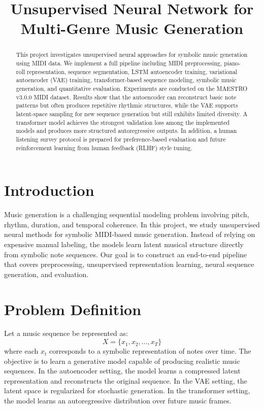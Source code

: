 \documentclass[conference]{IEEEtran}
\title{Unsupervised Neural Network for Multi-Genre Music Generation}
\author{
\IEEEauthorblockN{Your Name(s)}
\IEEEauthorblockA{
CSE425/EEE474 Neural Networks\\
BRAC University
}
}
\begin{document}
\maketitle

\begin{abstract}
This project investigates unsupervised neural approaches for symbolic music generation using MIDI data. We implement a full pipeline including MIDI preprocessing, piano-roll representation, sequence segmentation, LSTM autoencoder training, variational autoencoder (VAE) training, transformer-based sequence modeling, symbolic music generation, and quantitative evaluation. Experiments are conducted on the MAESTRO v3.0.0 MIDI dataset. Results show that the autoencoder can reconstruct basic note patterns but often produces repetitive rhythmic structures, while the VAE supports latent-space sampling for new sequence generation but still exhibits limited diversity. A transformer model achieves the strongest validation loss among the implemented models and produces more structured autoregressive outputs. In addition, a human listening survey protocol is prepared for preference-based evaluation and future reinforcement learning from human feedback (RLHF) style tuning.
\end{abstract}

\section{Introduction}
Music generation is a challenging sequential modeling problem involving pitch, rhythm, duration, and temporal coherence. In this project, we study unsupervised neural methods for symbolic MIDI-based music generation. Instead of relying on expensive manual labeling, the models learn latent musical structure directly from symbolic note sequences. Our goal is to construct an end-to-end pipeline that covers preprocessing, unsupervised representation learning, neural sequence generation, and evaluation.

\section{Problem Definition}
Let a music sequence be represented as:
\[
X = \{x_1, x_2, \dots, x_T\}
\]
where each \(x_t\) corresponds to a symbolic representation of notes over time. The objective is to learn a generative model capable of producing realistic music sequences. In the autoencoder setting, the model learns a compressed latent representation and reconstructs the original sequence. In the VAE setting, the latent space is regularized for stochastic generation. In the transformer setting, the model learns an autoregressive distribution over future music frames.
\end{document}
